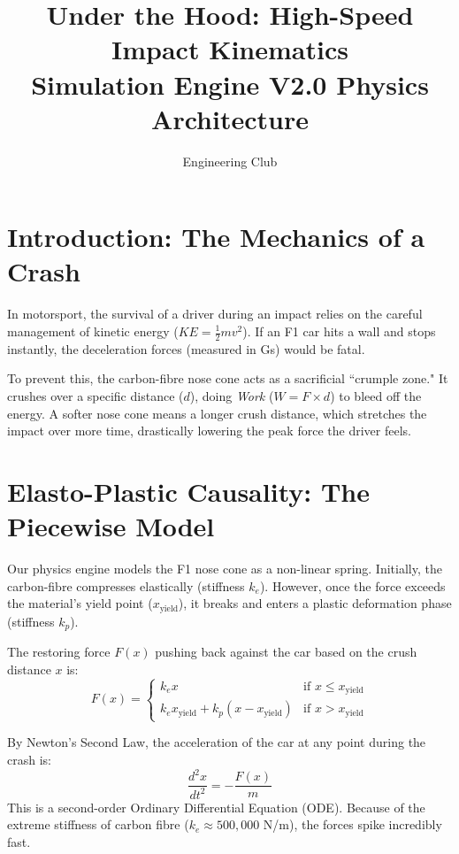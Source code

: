 \documentclass[12pt]{article}
\title{\vspace{-2cm}\textbf{\textcolor{simorange}{Under the Hood: High-Speed Impact Kinematics}}\\\large Simulation Engine V2.0 Physics Architecture}
\author{Engineering Club}
\date{}
\begin{document}
\maketitle
\thispagestyle{empty}

\section{Introduction: The Mechanics of a Crash}
In motorsport, the survival of a driver during an impact relies on the careful management of kinetic energy ($KE = \frac{1}{2}mv^2$). If an F1 car hits a wall and stops instantly, the deceleration forces (measured in Gs) would be fatal. 

To prevent this, the carbon-fibre nose cone acts as a sacrificial ``crumple zone." It crushes over a specific distance ($d$), doing \textit{Work} ($W = F \times d$) to bleed off the energy. A softer nose cone means a longer crush distance, which stretches the impact over more time, drastically lowering the peak force the driver feels.

\section{Elasto-Plastic Causality: The Piecewise Model}
Our physics engine models the F1 nose cone as a non-linear spring. Initially, the carbon-fibre compresses elastically (stiffness $k_e$). However, once the force exceeds the material's yield point ($x_{\text{yield}}$), it breaks and enters a plastic deformation phase (stiffness $k_p$). 

The restoring force $F(x)$ pushing back against the car based on the crush distance $x$ is:
\begin{equation}
    F(x) = \begin{cases} 
      k_e x & \text{if } x \le x_{\text{yield}} \\ 
      k_e x_{\text{yield}} + k_p (x - x_{\text{yield}}) & \text{if } x > x_{\text{yield}} 
   \end{cases}
\end{equation}

By Newton's Second Law, the acceleration of the car at any point during the crash is:
\begin{equation}
    \frac{d^2x}{dt^2} = -\frac{F(x)}{m}
\end{equation}
This is a second-order Ordinary Differential Equation (ODE). Because of the extreme stiffness of carbon fibre ($k_e \approx 500,000$ N/m), the forces spike incredibly fast. 
\end{document}

